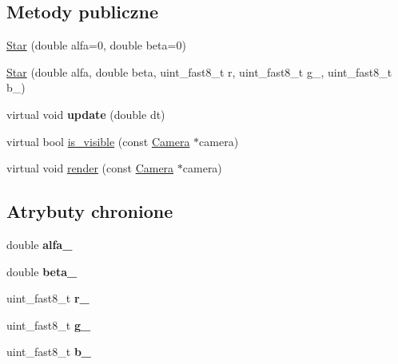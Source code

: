 \subsection*{Metody publiczne}
\begin{DoxyCompactItemize}
\item 
\hyperlink{class_star_ac79a6fb3556d6735f063cbc28fb73397}{Star} (double alfa=0, double beta=0)
\item 
\hyperlink{class_star_a125afff584b315791b7345151f978c99}{Star} (double alfa, double beta, uint\+\_\+fast8\+\_\+t r, uint\+\_\+fast8\+\_\+t g\+\_\+, uint\+\_\+fast8\+\_\+t b\+\_\+)
\item 
virtual void {\bfseries update} (double dt)\hypertarget{class_star_a6329b84f6a4434f93f744475336758da}{}\label{class_star_a6329b84f6a4434f93f744475336758da}

\item 
virtual bool \hyperlink{class_star_ac196fa232107776abeddba91ccdc3374}{is\+\_\+visible} (const \hyperlink{class_camera}{Camera} $\ast$camera)
\item 
virtual void \hyperlink{class_star_af0cb257b2c6e44cd26d75113e5e6675d}{render} (const \hyperlink{class_camera}{Camera} $\ast$camera)
\end{DoxyCompactItemize}
\subsection*{Atrybuty chronione}
\begin{DoxyCompactItemize}
\item 
double {\bfseries alfa\+\_\+}\hypertarget{class_star_acbc2ce5b635761779c628b82eebaa914}{}\label{class_star_acbc2ce5b635761779c628b82eebaa914}

\item 
double {\bfseries beta\+\_\+}\hypertarget{class_star_ac560d7b5ff53fea9b4c816bd0104fe9a}{}\label{class_star_ac560d7b5ff53fea9b4c816bd0104fe9a}

\item 
uint\+\_\+fast8\+\_\+t {\bfseries r\+\_\+}\hypertarget{class_star_afc7dd12c9f1876daec0d8900310df9d3}{}\label{class_star_afc7dd12c9f1876daec0d8900310df9d3}

\item 
uint\+\_\+fast8\+\_\+t {\bfseries g\+\_\+}\hypertarget{class_star_afacfcae0967a657fe5764e78439c2e57}{}\label{class_star_afacfcae0967a657fe5764e78439c2e57}

\item 
uint\+\_\+fast8\+\_\+t {\bfseries b\+\_\+}\hypertarget{class_star_abd9108ee6d13e26ef4a220777c2f40fa}{}\label{class_star_abd9108ee6d13e26ef4a220777c2f40fa}

\end{DoxyCompactItemize}


